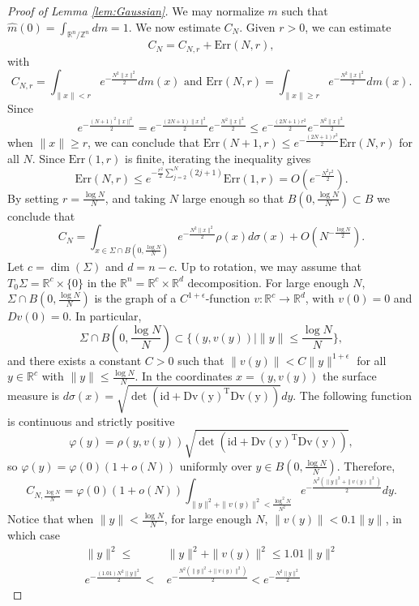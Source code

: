 \documentclass[11pt,letterpaper]{amsart}
\theoremstyle{definition}
\theoremstyle{plain}
\newcommand{\R}{{\mathbb R}}
\newcommand{\Z}{{\mathbb Z}}
\begin{document}
\begin{proof}[Proof of Lemma \ref{lem:Gaussian}]
We may normalize $m$ such that $\widehat{m}(0)=\int_{\R^n/\Z^n}dm=1$. We now estimate $C_N$. Given $r>0$, we can estimate 
\[C_{N}=C_{N,r}+\mathrm{Err}(N,r),\]
with
\begin{equation*}
    C_{N,
r}=  \int_{\|x\|<r}e^{-\frac{N^2\|x\|^2}{2}}dm(x)\textrm{ and }
\mathrm{Err}(N,r) =  
\int_{\|x\|\ge r}e^{-\frac{N^2\|x\|^2}{2}}dm(x).
\end{equation*}   
Since 
{ $$e^{-\frac{(N+1)^2\|x\|^2}{2}}=e^{-\frac{(2N+1)\|x\|^2}{2}}e^{-\frac{N^2\|x\|^2}{2}}\le e^{-\frac{(2N+1)r^2}{2}}e^{-\frac{N^2\|x\|^2}{2}} $$}
when $\|x\|\ge r$, we can conclude that $\mathrm{Err}(N+1,r)\le e^{-\frac{(2N+1)r^2}{2}}\mathrm{Err}(N,r)$ for all $N$. 
Since $\mathrm{Err}(1,r)$ is finite, iterating the inequality  gives
{\[\mathrm{Err}(N,r)\le e^{-\frac{r^2}{2}\sum_{j=2}^N(2j+1)}\mathrm{Err}(1,r)=O(e^{-\frac{N^2 r^2}{2}}). \]}
By setting $r=\frac{\log N}{N}$, 
and taking $N$ large enough so that $B(0,\frac{\log N}{N})\subset B$ we conclude that 
\[C_{N}=\int_{x\in \Sigma\cap B(0,\frac{\log N}{N})}e^{-\frac{N^2\|x\|^2}{2}}\rho(x)d\sigma(x)+O(N^{-\frac{\log N}{2}}).\]
Let $c=\dim(\Sigma)$ and $d=n-c$.
Up to rotation, we may assume that $T_{0}\Sigma=\R^{c}\times\{0\}$ in the $\R^n=\R^{c}\times\R^d$ decomposition. For large enough $N$, $\Sigma\cap B(0,\frac{\log N}{N})$ is the graph of a $C^{1+\epsilon}$-function $v\colon\R^{c}\to\R^d$, with $v(0)=0$ and $Dv(0)=0$. In particular, \[\Sigma\cap B(0,\frac{\log N}{N})\subset\{(y,v(y))\mid \|y\|\le \frac{\log N}{N} \},\]
and there exists a constant $C>0$ such that $\|v(y)\|<C \|y\|^{1+\epsilon}$ for all $y\in\R^c$ {with $\|y\|\le \frac{\log N}{N}$}. In the coordinates $x=(y,v(y))$ the surface measure is $d\sigma(x)=\sqrt{\det(\mathrm{id+Dv(y)^T Dv(y)})}dy$. The following function is continuous and strictly positive
\[\varphi(y)=\rho(y,v(y))\sqrt{\det(\mathrm{id+Dv(y)^T Dv(y)})},\]
so $\varphi(y)=\varphi(0)(1+o(N))$ uniformly over $y\in B(0,\frac{\log N}{N})$. Therefore,
\[C_{N,\frac{\log N}{N}}=\varphi(0)(1+o(N))\int_{\|y\|^2+\|v(y)\|^2<\frac{\log^2 N}{N^2}}e^{-\frac{N^2(\|y\|^2+\|v(y)\|^2)}{2}}dy.\]
Notice that when $\|y\|<\frac{\log N}{N}$, for large enough $N$, $\|v(y)\|<0.1\|y\|$, in which case
\begin{align*}
\|y\|^2
\le & \|y\|^2+\|v(y)\|^2\le 1.01\|y\|^2\\
  e^{-\frac{(1.01)N^{2}\|y\|^2}{2}}< & e^{-\frac{N^2(\|y\|^2+\|v(y)\|^2)}{2}}<e^{-\frac{N^2\|y\|^2}{2}}  
\end{align*}

\end{proof}
\end{document}
